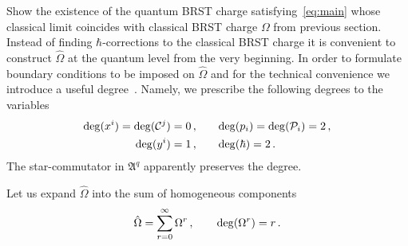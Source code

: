 \documentclass[a4paper,11pt,oneside]{amsart}
\theoremstyle{plain}
\numberwithin{equation}{section} %
\numberwithin{figure}{section} %
\renewcommand{\deg}[1]{{\rm deg}(#1)}
\def\cP{{\mathcal P}}
\def\cc{{\mathcal C}}
\def\aA{{ \mathfrak A}}
\begin{document}
\noindent
Show the existence of the quantum BRST charge
satisfying~\eqref{eq:main} whose classical limit coincides with
classical BRST charge $\Omega$ from previous section. Instead of
finding $\hbar$-corrections to the classical BRST charge it is
convenient to construct $\hat\Omega$ at the quantum level from
the very beginning.  In order to formulate
boundary conditions to be imposed on $\hat\Omega$
and for the technical convenience we introduce a useful
degree~\cite{[FL],[Fedosov-JDG]}.  Namely, we prescribe
the following degrees to the variables
\begin{equation}
\begin{split}
  \label{eq:degrees}
  \deg{x^i}=\deg{\cc^j}=0\,,&\qquad \deg{p_i}=\deg{\cP_i}=2 \,,\\
  \deg{y^i}=1\,,& \qquad  \deg{\hbar}=2\,.
\end{split}
\end{equation}
The star-commutator in $\aA^q$
apparently preserves the degree.

\noindent
Let us expand $\hat\Omega$ into the sum of homogeneous components
\begin{equation}
  \label{eq:Omega-expansion}
  {\hat\Omega}=\sum^\infty_{r=0} \Omega^r\,,\qquad \deg{\Omega^r}=r\,.
\end{equation}
\end{document}
